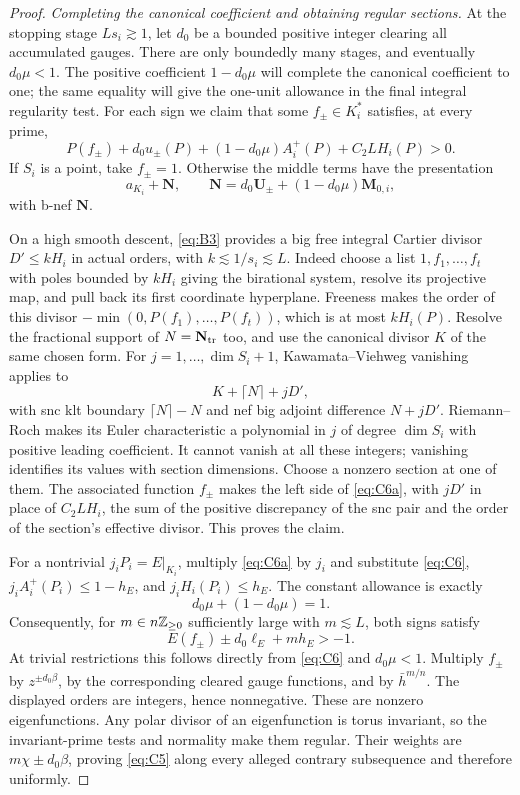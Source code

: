 \begin{proof}
\smallskip\noindent
\emph{Completing the canonical coefficient and obtaining regular sections.}
At the stopping stage \(Ls_i\gtrsim1\), let \(d_0\) be a bounded
positive integer clearing all accumulated gauges. There are only
boundedly many stages, and eventually \(d_0\mu<1\). The positive
coefficient $1-d_0\mu$ will complete the canonical coefficient to one;
the same equality will give the one-unit allowance in the final integral
regularity test. For each sign
we claim that some \(f_\pm\in K_i^*\) satisfies, at every prime,
\begin{equation}\label{eq:C6a}
 P(f_\pm)+d_0u_\pm(P)+(1-d_0\mu)A_i^+(P)+C_2LH_i(P)>0 .
\end{equation}
If \(S_i\) is a point, take \(f_\pm=1\). Otherwise the middle
terms have the presentation
\[
 a_{K_i}+\mathbf N,\qquad
 \mathbf N=d_0\mathbf U_\pm+(1-d_0\mu)\mathbf M_{0,i},
\]
with b-nef \(\mathbf N\).

On a high smooth descent, \eqref{eq:B3} provides a big free
integral Cartier divisor \(D'\le kH_i\) in actual orders,
with \(k\lesssim1/s_i\lesssim L\).
Indeed choose a list \(1,f_1,\ldots,f_t\) with poles bounded by
\(kH_i\) giving the birational system, resolve its projective map,
and pull back its first coordinate hyperplane. Freeness makes
the order of this divisor \(-\min(0,P(f_1),\ldots,P(f_t))\),
which is at most \(kH_i(P)\).
Resolve the fractional support of \(N=\mathbf N_{\rm tr}\) too,
and use the canonical divisor \(K\) of the same chosen form.
For \(j=1,\ldots,\dim S_i+1\), Kawamata--Viehweg vanishing
\cite[Theorem~3.1]{FujinoFundamental} applies to
\[
                         K+\lceil N\rceil+jD',
\]
with snc klt boundary \(\lceil N\rceil-N\) and nef big adjoint
difference \(N+jD'\). Riemann--Roch makes its Euler
characteristic a polynomial in \(j\) of degree \(\dim S_i\)
with positive leading coefficient. It cannot vanish at all
these integers; vanishing identifies its values with section
dimensions. Choose a nonzero section at one of them.
The associated function \(f_\pm\) makes the left side of
\eqref{eq:C6a}, with \(jD'\) in place of \(C_2LH_i\),
the sum of the positive discrepancy of the snc pair and the
order of the section's effective divisor. This proves the claim.

For a nontrivial \(j_iP_i=E|_{K_i}\), multiply
\eqref{eq:C6a} by \(j_i\) and substitute \eqref{eq:C6},
\(j_iA_i^+(P_i)\le1-h_E\), and \(j_iH_i(P_i)\le h_E\).
The constant allowance is exactly
\[
                         d_0\mu+(1-d_0\mu)=1.
\]
Consequently, for \(m\in n\mathbb Z_{\ge0}\) sufficiently large with
\(m\lesssim L\), both signs satisfy
\[
                         E(f_\pm)\pm d_0\ell_E+mh_E>-1.
\]
At trivial restrictions this follows directly from
\eqref{eq:C6} and \(d_0\mu<1\).
Multiply \(f_\pm\) by \(z^{\pm d_0\beta}\), by the corresponding
cleared gauge functions, and by \(\bar h^{m/n}\).
The displayed orders are integers, hence nonnegative.
These are nonzero eigenfunctions. Any polar divisor of an
eigenfunction is torus invariant, so the invariant-prime tests
and normality make them regular. Their weights are
\(m\chi\pm d_0\beta\), proving \eqref{eq:C5} along every
alleged contrary subsequence and therefore uniformly.
\end{proof}


